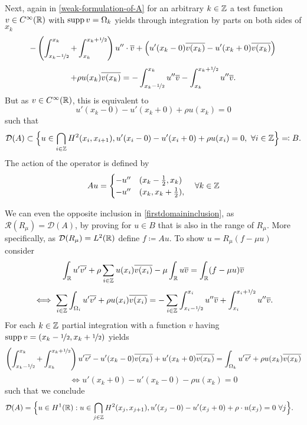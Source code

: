 Next, again in \eqref{weak-formulation-of-A} for an arbitrary $k \in \mathbb{Z}$ a test function $v \in C^{\infty}(\mathbb{R})$ with $\operatorname{supp} v = \Omega_{k}$ yields through integration by parts on both sides of $x_{k}$ 
	\[ -\left( \int_{x_{k}-\nicefrac{1}{2}}^{x_{k}} + \int_{x_{k}}^{x_{k} + \nicefrac{1}{2}}\right) u'' \cdot \overline{v} + \left( u'(x_{k}-0) \overline{v(x_{k})} - u'(x_{k} + 0) \overline{v(x_{k})} \right) \\ \]
	\[ +  \rho u(x_{k})\overline{v(x_{k})} = - \int_{x_{k} - \nicefrac{1}{2}}^{x_{k}} u'' \overline{v} - \int_{x_{k}}^{x_{k} + \nicefrac{1}{2}} u'' \overline{v}. \]
But as $v \in C^{\infty}(\mathbb{R})$, this is equivalent to
	\[ u'(x_{k}-0) - u'(x_{k}+0) + \rho u(x_{k}) = 0 \]
such that
	\begin{equation}
		\mathcal{D}(A) \subset \Big\{ u \in \bigcap_{i \in \mathbb{Z}} H^{2}(x_{i}, x_{i + 1}), u'(x_{i} - 0) - u'(x_{i} + 0) + \rho u(x_{i}) = 0 , ~\forall i \in \mathbb{Z} \Big\} \eqqcolon B. \label{firstdomaininclusion}
	\end{equation} 
The action of the operator is defined by
	\[ A u = \begin{cases}
					- u'' & (x_{k} - \frac{1}{2}, x_{k}) \\
					- u'' & (x_{k}, x_{k} + \frac{1}{2}),
				\end{cases} \quad \forall k \in \mathbb{Z} \]
				
We can even the opposite inclusion in \eqref{firstdomaininclusion}, as $\mathcal{R}(R_{\mu}) = \mathcal{D}(A)$, by proving for $u \in B$ that is also in the range of $R_{\mu}$. More specifically, as $\mathcal{D}(R_{\mu}) = L^{2}(\mathbb{R})$ define $f \coloneqq A u$. To show $u = R_{\mu}(f - \mu u)$ consider
	\[ \int_{\mathbb{R}} u' \overline{v'} + \rho \sum_{i \in \mathbb{Z}} u(x_{i}) \overline{v(x_{i})} - \mu \int_{\mathbb{R}} u \overline{v}= \int_{\mathbb{R}}(f-\mu u) \overline{v} \]
	\[ \iff \sum_{i \in \mathbb{Z}} \int_{\Omega_{i}} u' \overline{v'} + \rho u(x_{i}) \overline{v(x_{i})} = - \sum_{i \in \mathbb{Z}} \int_{x_{i} - \nicefrac{1}{2}}^{x_{i}} u'' \overline{v} + \int_{x_{i}}^{x_{i} + \nicefrac{1}{2}} u'' \overline{v}. \]
	For each $k \in \mathbb{Z}$ partial integration with a function $v$ having $\operatorname{supp} v = (x_{k} - \nicefrac{1}{2}, x_{k} + \nicefrac{1}{2})$ yields
	\[ \left( \int_{x_{k} - \nicefrac{1}{2}}^{x_{k}} + \int_{x_{k}}^{x_{k} +\nicefrac{1}{2}} \right) u' \overline{v'} - u'(x_{k}-0) \overline{v(x_{k})}  + u'(x_{k}+0) \overline{v(x_{k})}  = \int_{\Omega_{k}} u' \overline{v'} + \rho u(x_{k}) \overline{v(x_{k})} \]
	\[ \iff u'(x_{k}+0) - u'(x_{k}-0) - \rho u(x_{k}) = 0 \]
	such that we conclude
	\begin{align*}
		\mathcal{D}(A) & = \Big\{ u \in H^{1}(\mathbb{R}): u \in \bigcap_{j \in \mathbb{Z}} H^{2}(x_{j} , x_{j+1}), u'(x_{j} - 0) - u'(x_{j} + 0) + \rho \cdot u(x_{j}) = 0 ~\forall j \Big\}.
	\end{align*}

